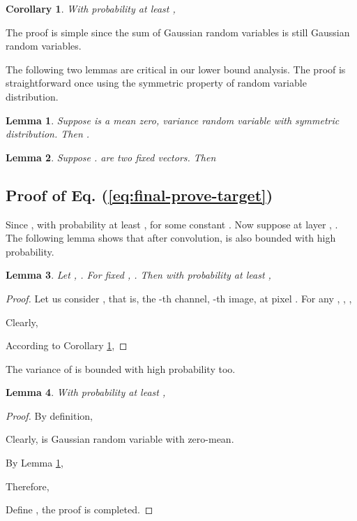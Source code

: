 \documentclass{article}
\newtheorem{lem}{Lemma}
\newtheorem{cor}{Corollary}
\begin{document}
\begin{cor}
\label{cor:sum-gaussian-upper-bound} With probability at least ,


\end{cor}

The proof is simple since the sum of Gaussian random variables is
still Gaussian random variables.

The following two lemmas are critical in our lower bound analysis.
The proof is straightforward once using the symmetric property of
random variable distribution.
\begin{lem}
\label{lem:square-norm-of-sym-var} Suppose  is a
mean zero, variance  random variable with symmetric distribution.
Then .
\end{lem}

{}
\begin{lem}
\label{lem:expect-theta-norm-exchange} Suppose .
 are two fixed vectors. Then

\end{lem}


\subsection{Proof of Eq. (\ref{eq:final-prove-target})}

Since , with probability
at least , 
for some constant . Now suppose at layer , .
The following lemma shows that after convolution, 
is also bounded with high probability.
\begin{lem}
\label{lem:norm-bound-of-conv} Let ,
.
For fixed ,
.
Then with probability at least ,

\end{lem}

\begin{proof}
Let us consider , that is,
the -th channel, -th image, at pixel . For
any , , ,

Clearly,

According to Corollary \ref{cor:sum-gaussian-upper-bound}, 


\end{proof}
The variance of  is bounded with high probability
too.
\begin{lem}
\label{lem:var-gt} With probability at least ,

\end{lem}

\begin{proof}
By definition,

Clearly,  is Gaussian random
variable with zero-mean.

By Lemma \ref{lem:square-norm-of-sym-var}, 

Therefore,

Define , the proof
is completed.
\end{proof}
\end{document}
